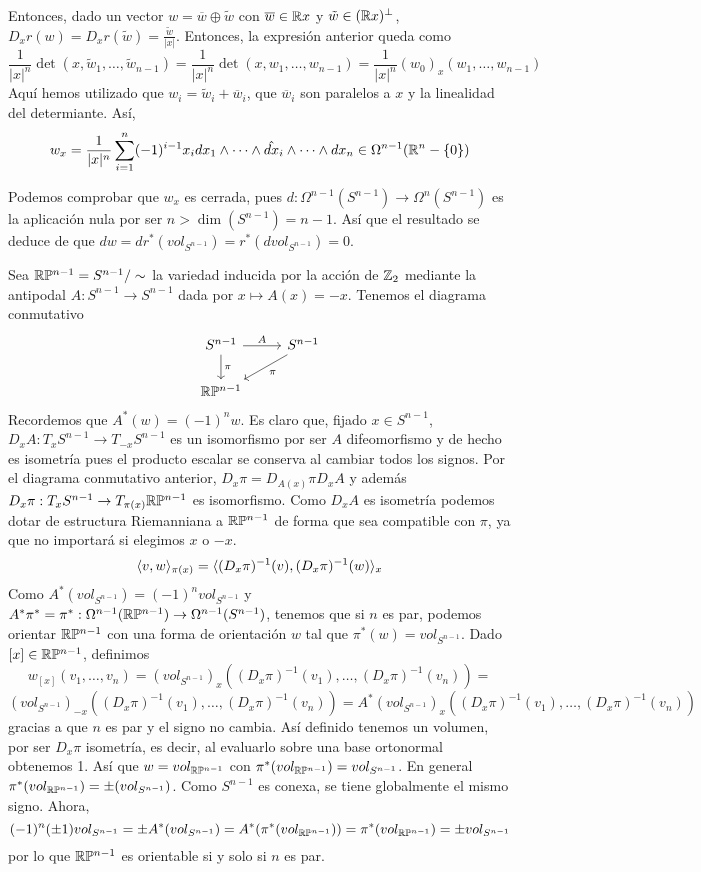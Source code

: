 \documentclass[CV.tex]{subfiles}
\begin{document}
\begin{ej}
Entonces, dado un vector $w=\overline{w}\oplus\tilde{w}$ con $\overline{w}\in\mathbb{R} x$ y $\tilde{w}\in (\mathbb{R} x)^{\perp}$, $D_xr(w)=D_xr(\tilde{w})=\frac{\tilde{w}}{|x|}$. Entonces, la expresión anterior queda como
\[
\frac{1}{|x|^n}\det(x,\tilde{w}_1,\dots, \tilde{w}_{n-1})=\frac{1}{|x|^n}\det(x,w_1,\dots, w_{n-1})=\frac{1}{|x|^n}(w_0)_x(w_1,\dots, w_{n-1})
\]
Aquí hemos utilizado que $w_i=\tilde{w}_i+\overline{w}_i$, que $\overline{w}_i$ son paralelos a $x$ y la linealidad del determiante. Así,
\[
w_x=\frac{1}{|x|^n}\sum_{i=1}^n(-1)^{i-1} x_i dx_1\land\dots\land\hat{dx}
_i\land\dots\land dx_n\in\Omega^{n-1}(\mathbb{R}^n-\{0\})\]

Podemos comprobar que $w_x$ es cerrada, pues $d:\Omega^{n-1}(S^{n-1})\to \Omega^n(S^{n-1})$ es la aplicación nula por ser $n>\dim(S^{n-1})=n-1$. Así que el resultado se deduce de que $dw=d r^*(vol_{S^{n-1}})=r^*(d vol_{S^{n-1}})=0$.  
\end{ej}

\begin{ej}
Sea $\mathbb{R} \mathbb{P}^{n-1}=S^{n-1}/\sim$ la variedad inducida por la acción de $\mathbb{Z}_2$ mediante la antipodal $A:S^{n-1}\to S^{n-1}$ dada por $x\mapsto A(x)=-x$. Tenemos el diagrama conmutativo
\[
\begin{tikzcd}
S^{n-1}\arrow[r,"A"]\arrow[d, "\pi"] & S^{n-1}\arrow[dl, "\pi"]\\
\R\PP^{n-1} & 
\end{tikzcd}
\]
Recordemos que $A^*(w)=(-1)^nw$. Es claro que, fijado $x\in S^{n-1}$, $D_xA: T_xS^{n-1}\to T_{-x}S^{n-1}$ es un isomorfismo por ser $A$ difeomorfismo y de hecho es isometría pues el producto escalar se conserva al cambiar todos los signos. Por el diagrama conmutativo anterior, $D_x\pi=D_{A(x)}\pi D_xA$ y además $D_x\pi: T_xS^{n-1}\to T_{\pi(x)}\mathbb{R}\mathbb{P}^{n-1}$ es isomorfismo. Como $D_xA$ es isometría podemos dotar de estructura Riemanniana a $\mathbb{R}\mathbb{P}^{n-1}$ de forma que sea compatible con $\pi$, ya que no importará si elegimos $x$ o $-x$.
\[
\langle{v,w}\rangle_{\pi(x)}=\langle{(D_x\pi)^{-1}(v),(D_x\pi)^{-1}(w)}\rangle_x
\]
Como $A^*(vol_{S^{n-1}})=(-1)^nvol_{S^{n-1}}$ y $A^*\pi^*=\pi^*:\Omega^{n-1}(\mathbb{R}\mathbb{P}^{n-1})\to\Omega^{n-1}(S^{n-1})$, tenemos que si $n$ es par, podemos orientar $\mathbb{R}\mathbb{P}^{n-1}$ con una forma de orientación $w$ tal que $\pi^*(w)=vol_{S^{n-1}}$. Dado $[x]\in\mathbb{R}\mathbb{P}^{n-1}$, definimos
\[
w_{[x]}(v_1,\dots, v_n)=(vol_{S^{n-1}})_x((D_x\pi)^{-1}(v_1),\dots, (D_x\pi)^{-1}(v_n))=
\] 
\[
(vol_{S^{n-1}})_{-x}((D_x\pi)^{-1}(v_1),\dots, (D_x\pi)^{-1}(v_n))=A^*(vol_{S^{n-1}})_x((D_x\pi)^{-1}(v_1),\dots, (D_x\pi)^{-1}(v_n))
\]
gracias a que $n$ es par y el signo no cambia. Así definido tenemos un volumen, por ser $D_x\pi$ isometría, es decir, al evaluarlo sobre una base ortonormal obtenemos 1. Así que $w=vol_{\mathbb{R}\mathbb{P}^{n-1}}$ con $\pi^*(vol_{\mathbb{R}\mathbb{P}^{n-1}})=vol_{S^{n-1}}$. En general $\pi^*(vol_{\mathbb{R}\mathbb{P}^{n-1}})=\pm (vol_{S^{n-1}})$. Como $S^{n-1}$ es conexa, se tiene globalmente el mismo signo. Ahora,
\[
(-1)^n(\pm 1)vol_{S^{n-1}}=\pm A^*(vol_{S^{n-1}})=A^*(\pi^*(vol_{\mathbb{R}\mathbb{P}^{n-1}}))=\pi^*(vol_{\mathbb{R}\mathbb{P}^{n-1}})=\pm vol_{S^{n-1}}
\]
por lo que $\mathbb{R}\mathbb{P}^{n-1}$ es orientable si y solo si $n$ es par.
\end{ej}
\end{document}

